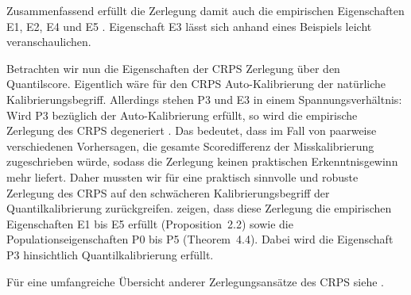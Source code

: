 Zusammenfassend erfüllt die Zerlegung damit auch die empirischen Eigenschaften E1, E2, E4 
und E5 \parencite[Theorem 3.3, angewendet auf Quantile]{gneiting2023regression}.  Eigenschaft E3 lässt sich anhand eines Beispiels leicht veranschaulichen.

Betrachten wir nun die Eigenschaften der CRPS Zerlegung über den Quantilscore. Eigentlich wäre für den CRPS Auto-Kalibrierung der natürliche Kalibrierungsbegriff. Allerdings stehen P3 und E3 in einem Spannungsverhältnis: Wird P3 bezüglich der Auto-Kalibrierung erfüllt, so wird die empirische Zerlegung des CRPS degeneriert \parencite{arnold2024decompositions}. Das bedeutet, dass im Fall von paarweise verschiedenen Vorhersagen, die gesamte Scoredifferenz der Misskalibrierung zugeschrieben würde, sodass die Zerlegung keinen praktischen Erkenntnisgewinn mehr liefert. Daher mussten wir für eine praktisch sinnvolle und robuste Zerlegung des CRPS auf den schwächeren Kalibrierungsbegriff der Quantilkalibrierung zurückgreifen. 
\textcite{arnold2024decompositions} zeigen, dass diese Zerlegung die empirischen Eigenschaften E1 bis E5 erfüllt (Proposition~2.2) sowie die Populationseigenschaften P0 bis P5 (Theorem~4.4). Dabei wird die Eigenschaft P3 hinsichtlich Quantilkalibrierung erfüllt.

Für eine umfangreiche Übersicht anderer Zerlegungsansätze des CRPS siehe \textcite{arnold2024decompositions}.


